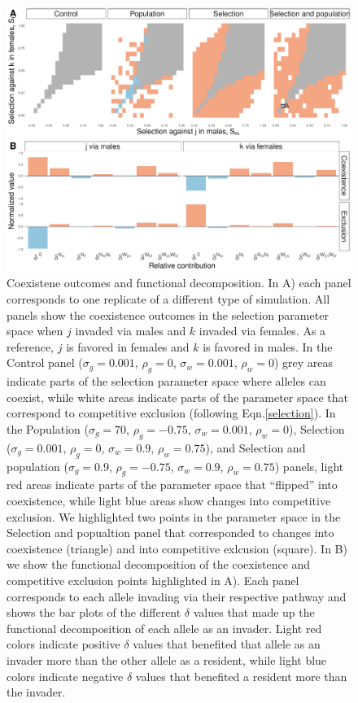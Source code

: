 \documentclass[12pt]{article}
\begin{document}
\begin{figure}[H]
  \centerline{\includegraphics[width=1\textwidth]{outcomes.pdf}}
  \caption{  Coexistene outcomes and functional decomposition. In A) each panel corresponds to one replicate of a different type of simulation. All panels show the coexistence outcomes in the selection parameter space when $j$ invaded via males and $k$ invaded via females. As a reference, $j$ is favored in females and $k$ is favored in males. In the Control panel ($\sigma_{g}=0.001$, $\rho_{g}=0$, $\sigma_{w}=0.001$, $\rho_{w}=0$) grey areas indicate parts of the selection parameter space where alleles can coexist, while white areas indicate parts of the parameter space that correspond to competitive exclusion (following Eqn.\ref{selection}). In the Population ($\sigma_{g}=70$, $\rho_{g}=-0.75$, $\sigma_{w}=0.001$, $\rho_{w}=0$), Selection ($\sigma_{g}=0.001$, $\rho_{g}=0$, $\sigma_{w}=0.9$, $\rho_{w}=0.75$), and Selection and population ($\sigma_{g}=0.9$, $\rho_{g}=-0.75$, $\sigma_{w}=0.9$, $\rho_{w}=0.75$) panels, light red areas indicate parts of the parameter space that ``flipped'' into coexistence, while light blue areas show changes into competitive exclusion. We highlighted two points in the parameter space in the Selection and popualtion panel that corresponded to changes into coexistence (triangle) and into competitive exlcusion (square).
   In B) we show the functional decomposition of the coexistence and competitive exclusion points highlighted in A). Each panel corresponds to each allele invading via their respective pathway and shows the bar plots of the different $\delta$ values that made up the functional decomposition of each allele as an invader. Light red colors indicate positive $\delta$ values that benefited that allele as an invader more than the other allele as a resident, while light blue colors indicate negative $\delta$ values that benefited a resident more than the invader. }
    \label{fig:outcomes}
\end{figure}
\end{document}
